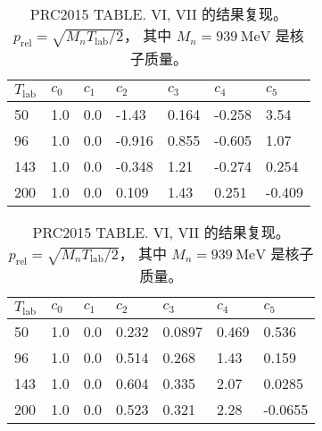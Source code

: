 
\begin{table}
  \caption{PRC2015 TABLE. VI, VII 的结果复现。
    $p_{\textrm{rel}}=\sqrt{M_nT_{\textrm{lab}}/2}$，
    其中 $M_n=\SI{939}{\mega\electronvolt}$ 是核子质量。\label{tab:tab67}}
  \begin{adjustbox}{width=1.2\textwidth, center}
    \begin{subtable}{.6\textwidth}
      \centering

\begin{tabular}{*{7}{l}}
  \toprule\hline
  $T_{\textrm{lab}}$ \quad &
  $c_0$ \quad & $c_1$ \quad & $c_2$ \quad &
  $c_3$ \quad & $c_4$ \quad & $c_5$ \quad \\
  \hline
  50 & 1.0 & 0.0 & -1.43 & 0.164 & -0.258 & 3.54  \\
  96 & 1.0 & 0.0 & -0.916 & 0.855 & -0.605 & 1.07 \\
  143 &1.0 & 0.0 & -0.348 & 1.21 & -0.274 & 0.254 \\
  200 &1.0 & 0.0 & 0.109 & 1.43 & 0.251 & -0.409\\
  \hline\bottomrule
\end{tabular}

    \end{subtable}%
    \begin{subtable}{.6\textwidth}
      \centering

\begin{tabular}{*{7}{l}}
  \toprule\hline
  $T_{\textrm{lab}}$ \quad &
  $c_0$ \quad & $c_1$ \quad & $c_2$ \quad &
  $c_3$ \quad & $c_4$ \quad & $c_5$ \quad \\
  \hline
  50 & 1.0 & 0.0 & 0.232 & 0.0897 & 0.469 & 0.536  \\
  96 & 1.0 & 0.0 & 0.514 & 0.268 & 1.43 & 0.159    \\
  143 &1.0 & 0.0 & 0.604 & 0.335 & 2.07 & 0.0285   \\
  200 &1.0 & 0.0 & 0.523 & 0.321 & 2.28 & -0.0655  \\
  \hline\bottomrule
\end{tabular}

    \end{subtable}
    \end{adjustbox}

\end{table}
